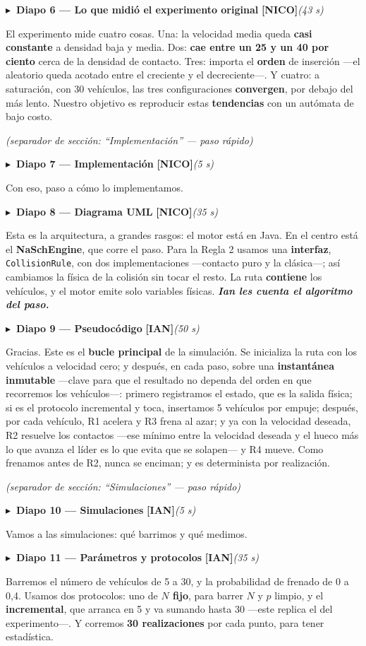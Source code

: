 \documentclass[11pt,a4paper]{article}
\newcommand{\diapo}[5]{%
  \medskip\par\noindent
  \textcolor{#4}{\textbf{$\blacktriangleright$\ Diapo #1 --- #2}}\quad
  \textcolor{#4}{\textbf{[#3]}}\hfill{\itshape\small(#5)}\par\nobreak\smallskip
}
\newcommand{\relevo}[1]{\hfill\textbf{\itshape #1}}
\newcommand{\seccion}[1]{\smallskip\par\noindent\textit{(separador de sección: ``#1'' --- paso rápido)}\par}
\begin{document}
\diapo{6}{Lo que midió el experimento original}{NICO}{cnico}{43 s}
El experimento mide cuatro cosas. Una: la velocidad media queda \textbf{casi constante} a densidad baja y
media. Dos: \textbf{cae entre un 25 y un 40 por ciento} cerca de la densidad de contacto. Tres: importa el
\textbf{orden} de inserción ---el aleatorio queda acotado entre el creciente y el decreciente---. Y cuatro:
a saturación, con 30 vehículos, las tres configuraciones \textbf{convergen}, por debajo del más lento.
Nuestro objetivo es reproducir estas \textbf{tendencias} con un autómata de bajo costo.

\seccion{Implementación}
\diapo{7}{Implementación}{NICO}{cnico}{5 s}
Con eso, paso a cómo lo implementamos.

\diapo{8}{Diagrama UML}{NICO}{cnico}{35 s}
Esta es la arquitectura, a grandes rasgos: el motor está en Java. En el centro está el
\textbf{NaSchEngine}, que corre el paso. Para la Regla 2 usamos una \textbf{interfaz},
\texttt{CollisionRule}, con dos implementaciones ---contacto puro y la clásica---; así cambiamos la física
de la colisión sin tocar el resto. La ruta \textbf{contiene} los vehículos, y el motor emite solo
variables físicas. \relevo{Ian les cuenta el algoritmo del paso.}

\diapo{9}{Pseudocódigo}{IAN}{cian}{50 s}
Gracias. Este es el \textbf{bucle principal} de la simulación. Se inicializa la ruta con los vehículos a
velocidad cero; y después, en cada paso, sobre una \textbf{instantánea inmutable} ---clave para que el
resultado no dependa del orden en que recorremos los vehículos---: primero registramos el estado, que es la
salida física; si es el protocolo incremental y toca, insertamos 5 vehículos por empuje; después, por cada
vehículo, R1 acelera y R3 frena al azar; y ya con la velocidad deseada, R2 resuelve los contactos ---ese
mínimo entre la velocidad deseada y el hueco más lo que avanza el líder es lo que evita que se solapen--- y
R4 mueve. Como frenamos antes de R2, nunca se enciman; y es determinista por realización.

\seccion{Simulaciones}
\diapo{10}{Simulaciones}{IAN}{cian}{5 s}
Vamos a las simulaciones: qué barrimos y qué medimos.

\diapo{11}{Parámetros y protocolos}{IAN}{cian}{35 s}
Barremos el número de vehículos de 5 a 30, y la probabilidad de frenado de 0 a 0,4. Usamos dos protocolos:
uno de \textbf{$N$ fijo}, para barrer $N$ y $p$ limpio, y el \textbf{incremental}, que arranca en 5 y va
sumando hasta 30 ---este replica el del experimento---. Y corremos \textbf{30 realizaciones} por cada punto,
para tener estadística.
\end{document}
